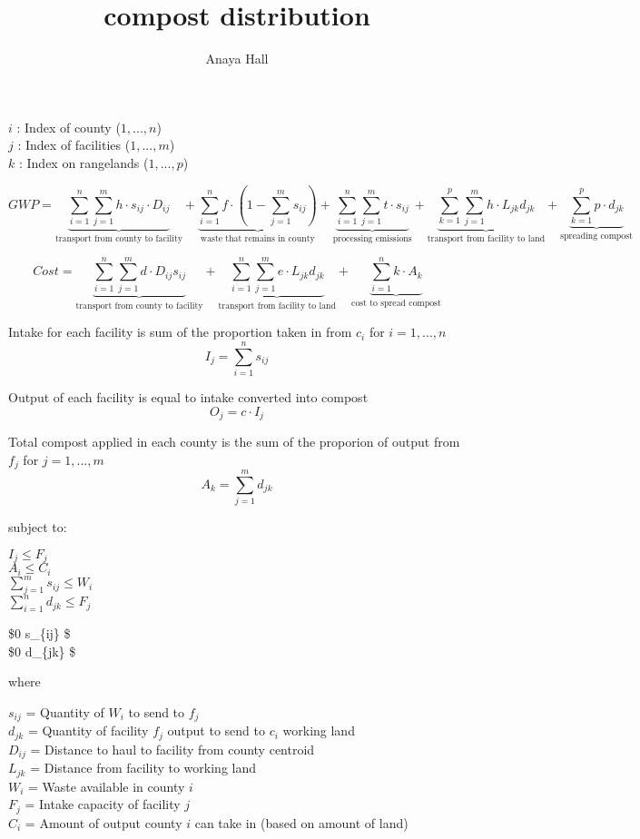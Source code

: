 \documentclass[12 pt,]{article}
\title{compost distribution}
\author{Anaya Hall}
\date{}
\begin{document}
\maketitle

\(i\) : Index of county (\(1,...,n\))\\
\(j\) : Index of facilities (\(1,...,m\))\\
\(k\) : Index on rangelands (\(1,...,p\))

\[GWP = 
\underbrace{\sum_{i=1}^{n} \sum_{j=1}^{m} h \cdot s_{ij} \cdot D_{ij} }_{\text{transport from county to facility}} + 
\underbrace{\sum_{i=1}^{n} f \cdot (1-\sum_{j=1}^{m}s_{ij}) }_{\text{waste that remains in county}} +  
\underbrace{\sum_{i=1}^{n} \sum_{j=1}^{m} t \cdot s_{ij}}_{\text{processing emissions}} + 
\underbrace{\sum_{k=1}^{p} \sum_{j=1}^{m} h \cdot L_{jk}d_{jk} }_{\text{transport from facility to land}} +  
\underbrace{\sum_{k=1}^p p \cdot d_{jk}}_{\text{spreading compost}} \]

\[ Cost = 
\underbrace{\sum_{i=1}^{n} \sum_{j=1}^{m} d \cdot D_{ij} s_{ij} }_{\text{transport from county to facility}} +  
\underbrace{\sum_{i=1}^{n} \sum_{j=1}^{m} e \cdot L_{jk}d_{jk} }_{\text{transport from facility to land}} +  
\underbrace{\sum_{i=1}^n k \cdot A_k}_{\text{cost to spread compost}} \]

Intake for each facility is sum of the proportion taken in from \(c_i\)
for \(i = 1,...,n\)\\
\[I_j = \sum_{i=1}^{n} s_{ij}\]

Output of each facility is equal to intake converted into compost\\
\[O_j = c \cdot I_j\]

Total compost applied in each county is the sum of the proporion of
output from \(f_j\) for \(j = 1,...,m\)\\
\[A_k = \sum_{j=1}^{m} d_{jk}\]

subject to:

\(I_j \leq F_j\)\\
\(A_i \leq C_i\)\\
\(\sum_{j=1}^{m} s_{ij} \leq W_i\)\\
\(\sum_{i=1}^{n} d_{jk} \leq F_j\)

\$0 \leq s\_\{ij\} \$\\
\$0 \leq d\_\{jk\} \$

where

\(s_{ij}\) = Quantity of \(W_i\) to send to \(f_j\)\\
 \(d_{jk}\) = Quantity of facility \(f_j\) output to send to \(c_i\)
working land\\
 \(D_{ij}\) = Distance to haul to facility from county centroid\\
\(L_{jk}\) = Distance from facility to working land\\
\(W_i\) = Waste available in county \(i\)\\
\(F_j\) = Intake capacity of facility \(j\)\\
\(C_i\) = Amount of output county \(i\) can take in (based on amount of
land)
\end{document}
